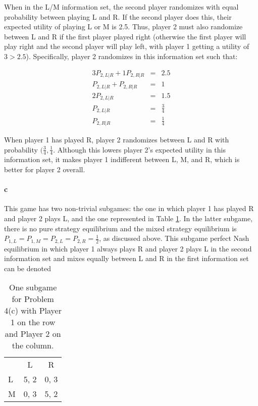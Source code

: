 \begin{answer}{4}
When in the L/M information set, the second player randomizes with equal probability between playing L and R. If the second player does this, their expected utility of playing L or M is 2.5. Thus, player 2 must also randomize between L and R if the first player played right (otherwise the first player will play right and the second player will play left, with player 1 getting a utility of $3>2.5$). Specifically, player 2 randomizes in this information set such that:

\begin{eqnarray*}
3 P_{2,L|R} + 1 P_{2,R|R} &=& 2.5 \\
P_{2,L|R} + P_{2,R|R} &=& 1 \\
2 P_{2,L|R} &=& 1.5 \\
P_{2,L|R} &=& \frac{3}{4} \\
P_{2,R|R} &=& \frac{1}{4}
\end{eqnarray*}

When player 1 has played R, player 2 randomizes between L and R with probability $(\frac{3}{4}, \frac{1}{4}$. Although this lowers player 2's expected utility in this information set, it makes player 1 indifferent between L, M, and R, which is better for player 2 overall. 


\paragraph{c} This game has two non-trivial subgames: the one in which player 1 has played R and player 2 plays L, and the one represented in Table \ref{tab:4c}. In the latter subgame, there is no pure strategy equilibrium and the mixed strategy equilibrium is $P_{1,L}=P_{1,M}=P_{2,L}=P_{2,R}=\frac{1}{2}$, as discussed above. This subgame perfect Nash equilibrium in which player 1 always plays R and player 2 plays L in the second information set and mixes equally between L and R in the first information set can be denoted \\

\begin{table}[h!]
\begin{center}
\begin{tabular}{l|c|c|}
\multicolumn{1}{c}{} & \multicolumn{1}{c}{L} & \multicolumn{1}{c}{R} \\
\cline{2-3}
L & 5, 2 & 0, 3 \\
\cline{2-3}
M & 0, 3 & 5, 2 \\
\cline{2-3}
\end{tabular}
\caption{One subgame for Problem 4(c) with Player 1 on the row and Player 2 on the column.}
\label{tab:4c}
\end{center}
\end{table}

\end{answer}


